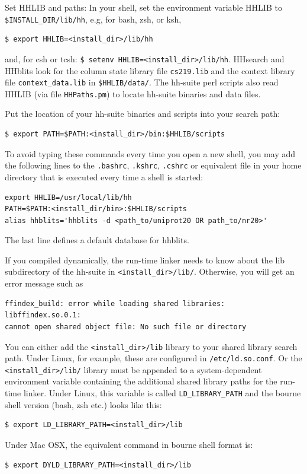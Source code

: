 \documentclass[11pt,a4paper]{article}
\begin{document}
\begin{enum}
\item Set HHLIB and paths: In your shell, set the environment variable HHLIB to \verb`$INSTALL_DIR/lib/hh`, 
e.g, for bash, zsh, or ksh,
\begin{verbatim}
$ export HHLIB=<install_dir>/lib/hh
\end{verbatim}
and, for csh or tcsh: \verb`$ setenv HHLIB=<install_dir>/lib/hh`. 
HHsearch and HHblits look for the column state library file \verb`cs219.lib`
and the context library file \verb`context_data.lib` in \verb`$HHLIB/data/`. The hh-suite
perl scripts also read HHLIB (via file \verb`HHPaths.pm`) to locate hh-suite binaries and data files.

Put the location of your hh-suite binaries and scripts into your search path:
\begin{verbatim}
$ export PATH=$PATH:<install_dir>/bin:$HHLIB/scripts
\end{verbatim}

To avoid typing these commands every time you open a new shell, you may add the following lines to the \verb`.bashrc`, \verb`.kshrc`, \verb`.cshrc` or equivalent file in your home directory that is executed every time a shell is started:
\begin{verbatim}
export HHLIB=/usr/local/lib/hh
PATH=$PATH:<install_dir/bin>:$HHLIB/scripts
alias hhblits='hhblits -d <path_to/uniprot20 OR path_to/nr20>'
\end{verbatim}
The last line defines a default database for hhblits. 
\vspace{2mm}


\item If you compiled dynamically, the run-time linker needs to know about the lib subdirectory 
of the hh-suite in \verb`<install_dir>/lib/`. Otherwise, you will get an error message such as
\begin{verbatim}
ffindex_build: error while loading shared libraries: libffindex.so.0.1: 
cannot open shared object file: No such file or directory
\end{verbatim}
You can either add the \verb`<install_dir>/lib` library to your shared library search path. 
Under Linux, for example, these are configured in \verb`/etc/ld.so.conf`. 
Or the \verb`<install_dir>/lib/` library must be appended to a system-dependent environment variable 
containing the additional shared library paths for the run-time linker.
Under Linux, this variable is called \verb`LD_LIBRARY_PATH` and the bourne shell version (bash, zsh etc.) looks like this:
\begin{verbatim}
$ export LD_LIBRARY_PATH=<install_dir>/lib
\end{verbatim}
Under Mac OSX, the equivalent command in bourne shell format is:
\begin{verbatim}
$ export DYLD_LIBRARY_PATH=<install_dir>/lib
\end{verbatim}
\vspace{2mm}


\end{enum}
\end{document}

